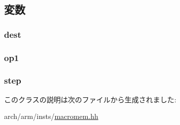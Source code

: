 \subsection{変数}
\hypertarget{classArmISA_1_1MicroNeonMixOp_a6563276134c2f303bab0c30e83e02220}{
\subsubsection[{dest}]{ {\bf dest}}}
\label{classArmISA_1_1MicroNeonMixOp_a6563276134c2f303bab0c30e83e02220}
\hypertarget{classArmISA_1_1MicroNeonMixOp_ae55982e6b9309683aef1b44249ab406f}{
\subsubsection[{op1}]{ {\bf op1}}}
\label{classArmISA_1_1MicroNeonMixOp_ae55982e6b9309683aef1b44249ab406f}
\hypertarget{classArmISA_1_1MicroNeonMixOp_a739c65d9c925e3793560160ef5a96d6f}{
\subsubsection[{step}]{ {\bf step}}}
\label{classArmISA_1_1MicroNeonMixOp_a739c65d9c925e3793560160ef5a96d6f}


このクラスの説明は次のファイルから生成されました:\begin{DoxyCompactItemize}
\item 
arch/arm/insts/\hyperlink{macromem_8hh}{macromem.hh}\end{DoxyCompactItemize}
